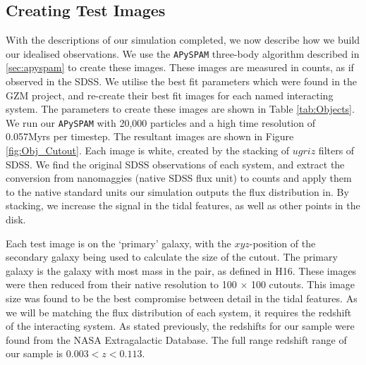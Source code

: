 \subsection{Creating Test Images}\label{sec:syn_sample}
With the descriptions of our simulation completed, we now describe how we build our idealised observations. We use the \texttt{APySPAM} three-body algorithm described in \DIFdelbegin {}\DIFdelend \DIFaddbegin {}\DIFaddend \ref{sec:apyspam} to create these images. These images are measured in counts, as if observed in the SDSS. We utilise the best fit parameters which were found in the GZM project, and re-create their best fit images for each named interacting system. The parameters to create these images are shown in Table \ref{tab:Objects}. We run our \texttt{APySPAM} with 20,000 particles and a high time resolution of 0.057Myrs per timestep. The resultant images are shown in Figure \ref{fig:Obj_Cutout}. Each image is \DIFdelbegin {}\DIFdelend white, created by the stacking of $ugriz$ filters of SDSS. We find the original SDSS observations of each system, and extract the conversion from nanomaggies (native SDSS flux unit) to counts and apply them to the native standard units our simulation outputs the flux distribution in. By stacking, we increase the signal in the tidal features, as well as other points in the disk. 

Each test image is \DIFdelbegin {}\DIFdelend \DIFaddbegin {}\DIFaddend on the `primary' galaxy, with the $xyz$-position of the secondary galaxy being used to calculate the size of the cutout. The primary galaxy is the galaxy with most mass in the pair, as defined in H16. These images were then reduced from their native resolution to 100 $\times$ 100 cutouts. This image size was found to be the best compromise between detail in the tidal features. As we will be matching the flux distribution of each system, it requires the redshift of the interacting system. As stated previously, the redshifts for our sample were found from the NASA Extragalactic Database. The full range redshift range of our sample is $0.003 < z < 0.113$.

